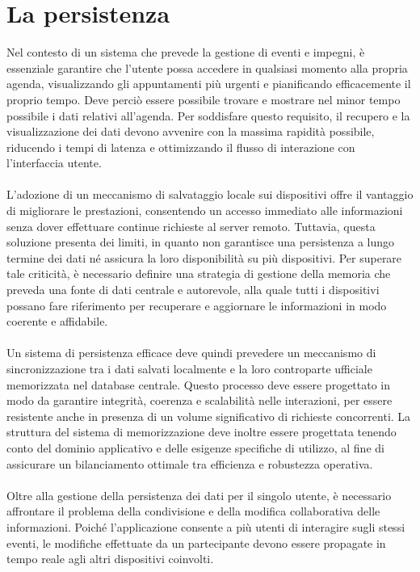 \section{La persistenza}

Nel contesto di un sistema che prevede la gestione di eventi e impegni, è essenziale garantire che l’utente possa accedere in qualsiasi momento alla propria agenda, 
visualizzando gli appuntamenti più urgenti e pianificando efficacemente il proprio tempo. 
Deve perciò essere possibile trovare e mostrare nel minor tempo possibile i dati relativi all’agenda. 
Per soddisfare questo requisito, il recupero e la visualizzazione dei dati devono avvenire con la massima rapidità possibile, 
riducendo i tempi di latenza e ottimizzando il flusso di interazione con l’interfaccia utente. \\
\\
L’adozione di un meccanismo di salvataggio locale sui dispositivi offre il vantaggio di migliorare le prestazioni, 
consentendo un accesso immediato alle informazioni senza dover effettuare continue richieste al server remoto. 
Tuttavia, questa soluzione presenta dei limiti, in quanto non garantisce una persistenza a lungo termine dei dati né assicura la loro disponibilità su più dispositivi. 
Per superare tale criticità, è necessario definire una strategia di gestione della memoria che preveda una fonte di dati centrale e autorevole, 
alla quale tutti i dispositivi possano fare riferimento per recuperare e aggiornare le informazioni in modo coerente e affidabile.\\
\\
Un sistema di persistenza efficace deve quindi prevedere un meccanismo di sincronizzazione tra i dati salvati localmente e la loro controparte ufficiale memorizzata nel database centrale. 
Questo processo deve essere progettato in modo da garantire integrità, coerenza e scalabilità nelle interazioni, 
per essere resistente anche in presenza di un volume significativo di richieste concorrenti. 
La struttura del sistema di memorizzazione deve inoltre essere progettata tenendo conto del dominio applicativo e delle esigenze specifiche di utilizzo, 
al fine di assicurare un bilanciamento ottimale tra efficienza e robustezza operativa.\\
\\
Oltre alla gestione della persistenza dei dati per il singolo utente, è necessario affrontare il problema della condivisione e della modifica collaborativa delle informazioni. 
Poiché l’applicazione consente a più utenti di interagire sugli stessi eventi, le modifiche effettuate da un partecipante devono essere propagate in tempo reale agli altri dispositivi coinvolti. 
